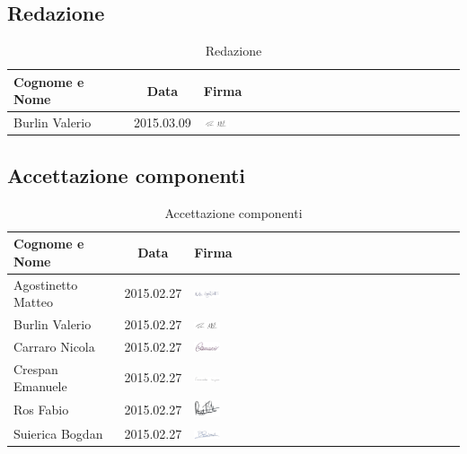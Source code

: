 \subsection{Redazione}

\begin{table}[h]
	\centering
	\begin{tabular}{|l|c|l|}
		\toprule
		\textbf{Cognome e Nome} & \textbf{Data} & \textbf{Firma} \\
		
		\midrule
		Burlin Valerio & 2015.03.09 & \includegraphics[width=0.1\textwidth]{./img/valerio_burlin.png} \\
		
		\bottomrule
	\end{tabular}
	\caption{Redazione}
\end{table}

\subsection{Accettazione componenti}

\begin{table}[h]
	\centering
	\begin{tabular}{|l|c|l|}
		\toprule
		\textbf{Cognome e Nome} & \textbf{Data} & \textbf{Firma} \\
		
		\midrule
		Agostinetto Matteo & 2015.02.27 & \includegraphics[width=0.1\textwidth]{./img/matteo_agostinetto.png} \\
		Burlin Valerio & 2015.02.27 & \includegraphics[width=0.1\textwidth]{./img/valerio_burlin.png} \\ 
		Carraro Nicola & 2015.02.27 & \includegraphics[width=0.1\textwidth]{./img/nicola_carraro.png} \\
		Crespan Emanuele & 2015.02.27 & \includegraphics[width=0.1\textwidth]{./img/emanuele_crespan.png} \\
		Ros Fabio & 2015.02.27 & \includegraphics[width=0.1\textwidth]{./img/fabio_ros.png} \\
		Suierica Bogdan & 2015.02.27 & \includegraphics[width=0.1\textwidth]{./img/bogdan_suierica.png} \\
		
		\bottomrule
	\end{tabular}
	\caption{Accettazione componenti}
\end{table}

